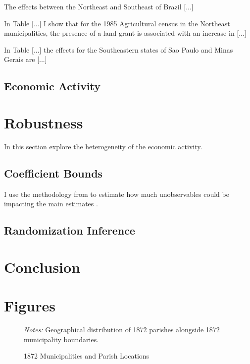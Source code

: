 \documentclass{article}
\begin{document}
The effects between the Northeast and Southeast of Brazil [...]

In Table [...] I show that for the 1985 Agricultural census in the Northeast municipalities, the presence of a land grant is associated with an increase in [...]

In Table [...] the effects for the Southeastern states of Sao Paulo and Minas Gerais are [...]

\parencite{Mueller1995-gi}

\subsection{Economic Activity}

\section{Robustness}

In this section explore the heterogeneity of the economic activity. 

\subsection{Coefficient Bounds}

I use the methodology from to estimate how much unobservables could be impacting the main estimates \textcite{Masten2022-bg}.

\subsection{Randomization Inference}

\section{Conclusion}

\clearpage



\printbibliography

\clearpage

\section*{Figures}

\begin{figure}[h!]
  \caption{1872 Municipalities and Parish Locations}
  \begin{center}
  \textit{Notes:} Geographical distribution of 1872 parishes alongside 1872 municipality boundaries.
  \end{center}
  \label{fig:parishes_1872}
\end{figure}
\end{document}
